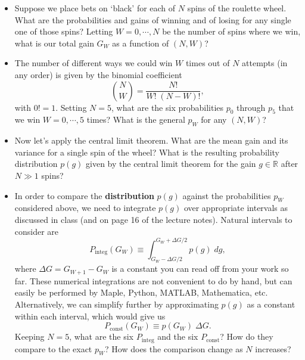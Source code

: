\documentclass[12 pt]{article} %
\newcommand{\Rbb}{\ensuremath{\mathbb R} }
\newcommand{\De}{\ensuremath{\Delta} }
\begin{document}
\begin{itemize}
  \item Suppose we place  bets on `black' for each of $N$ spins of the roulette wheel.
        What are the probabilities and gains of winning and of losing for any single one of those spins?
        Letting $W = 0, \cdots, N$ be the number of spins where we win, what is our total gain $G_W$ as a function of $(N, W)$? \\[8 pt]
  \item The number of different ways we could win $W$ times out of $N$ attempts (in any order) is given by the binomial coefficient
        \begin{equation*}
          \binom{N}{W} = \frac{N!}{W! \; (N - W)!},
        \end{equation*}
        with $0! = 1$.
        Setting $N = 5$, what are the six probabilities $p_0$ through $p_5$ that we win $W = 0, \cdots, 5$ times?
        What is the general $p_W$ for any $(N, W)$? \\[8 pt]
  \item Now let's apply the central limit theorem.
        What are the mean gain and its variance for a single spin of the wheel?
        What is the resulting probability distribution $p(g)$ given by the central limit theorem for the gain $g \in \Rbb$ after $N \gg 1$ spins? \\[8 pt]
  \item In order to compare the \textbf{distribution} $p(g)$ against the probabilities $p_W$ considered above, we need to integrate $p(g)$ over appropriate intervals as discussed in class (and on page 16 of the lecture notes).
        Natural intervals to consider are
        \begin{equation*}
          P_{\text{integ}}(G_W) \equiv \int_{G_W - \De G / 2}^{G_W + \De G / 2} p(g) \; dg,
        \end{equation*}
        where $\De G = G_{W + 1} - G_W$ is a constant you can read off from your work so far.
        These numerical integrations are not convenient to do by hand, but can easily be performed by Maple, Python, MATLAB, Mathematica, etc.
        Alternatively, we can simplify further by approximating $p(g)$ as a constant within each interval, which would give us
        \begin{equation*}
          P_{\text{const}}(G_W) \equiv p(G_W) \; \De G.
        \end{equation*}
        Keeping $N = 5$, what are the six $P_{\text{integ}}$ and the six $P_{\text{const}}$?
        How do they compare to the exact $p_W$?
        How does the comparison change as $N$ increases?
\end{itemize}
\end{document}
